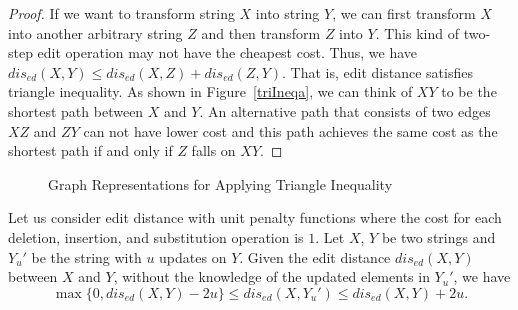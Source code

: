 \begin{proof}
If we want to transform string $X$ into string $Y$, we can first transform $X$ into another arbitrary string $Z$ and then transform $Z$ into $Y$. This kind of two-step edit operation may not have the cheapest cost. Thus, we have $dis_{ed}(X,Y) \leq dis_{ed}(X,Z)+dis_{ed}(Z,Y).$ That is, edit distance satisfies triangle inequality. As shown in Figure~\ref{triIneqa}, we can think of $XY$ to be the shortest path between $X$ and $Y$. An alternative path that consists of two edges $XZ$ and $ZY$ can not have lower cost and this path achieves the same cost as the shortest path if and only if $Z$ falls on $XY$.
\end{proof}


\begin{figure}[tb]
\centering
{}
\quad
{}

\caption{Graph Representations for Applying Triangle Inequality}
\label{triIneq}
\end{figure}


\begin{property}\label{ppt:bound-ed}

Let us consider edit distance with unit penalty functions where the cost for each deletion, insertion, and substitution operation is $1$. Let $X$, $Y$ be two strings and $Y_u'$ be the string with $u$ updates on $Y$. Given the edit distance $dis_{ed}(X, Y)$ between $X$ and $Y$, without the knowledge of the updated elements in $Y_u'$, we have 
$$\max\{0, dis_{ed}(X, Y) - 2u\} \leq dis_{ed}(X, Y_u') \leq dis_{ed}(X, Y) + 2u.$$

\end{property}

